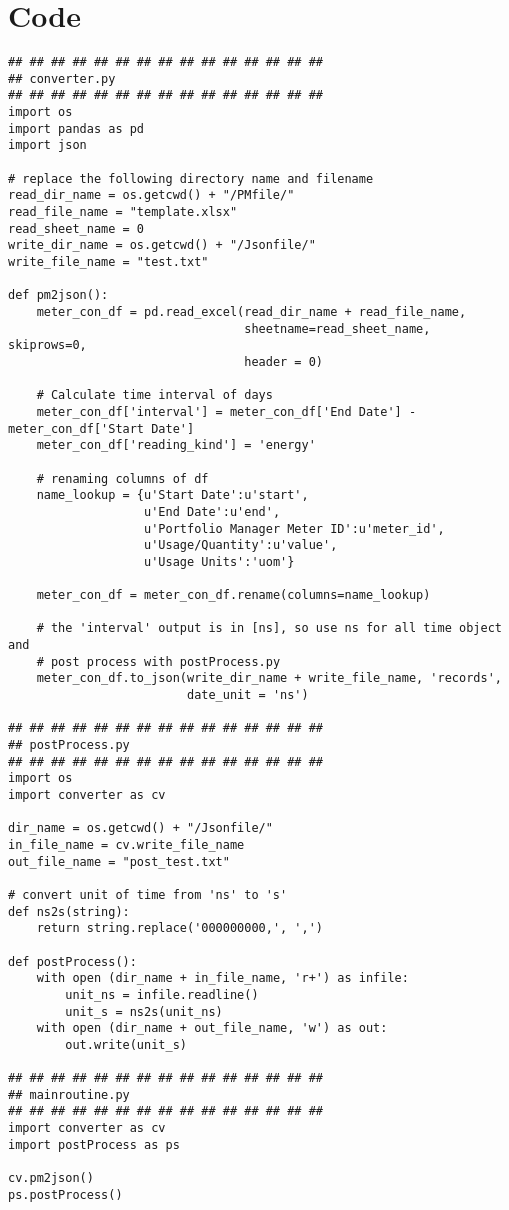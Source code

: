 \documentclass[12pt]{article}
\begin{document}
\section{Code}
\makeatletter
\def\verbatim@font{\linespread{1}\tiny\ttfamily}
\makeatother
\begin{verbatim}
## ## ## ## ## ## ## ## ## ## ## ## ## ## ## 
## converter.py
## ## ## ## ## ## ## ## ## ## ## ## ## ## ## 
import os 
import pandas as pd
import json

# replace the following directory name and filename
read_dir_name = os.getcwd() + "/PMfile/"
read_file_name = "template.xlsx"
read_sheet_name = 0
write_dir_name = os.getcwd() + "/Jsonfile/"
write_file_name = "test.txt"

def pm2json():
    meter_con_df = pd.read_excel(read_dir_name + read_file_name,
                                 sheetname=read_sheet_name, skiprows=0,
                                 header = 0)

    # Calculate time interval of days
    meter_con_df['interval'] = meter_con_df['End Date'] - meter_con_df['Start Date']
    meter_con_df['reading_kind'] = 'energy'

    # renaming columns of df
    name_lookup = {u'Start Date':u'start',
                   u'End Date':u'end',
                   u'Portfolio Manager Meter ID':u'meter_id',
                   u'Usage/Quantity':u'value',
                   u'Usage Units':'uom'}

    meter_con_df = meter_con_df.rename(columns=name_lookup)

    # the 'interval' output is in [ns], so use ns for all time object and
    # post process with postProcess.py
    meter_con_df.to_json(write_dir_name + write_file_name, 'records',
                         date_unit = 'ns')

## ## ## ## ## ## ## ## ## ## ## ## ## ## ## 
## postProcess.py
## ## ## ## ## ## ## ## ## ## ## ## ## ## ## 
import os 
import converter as cv

dir_name = os.getcwd() + "/Jsonfile/"
in_file_name = cv.write_file_name
out_file_name = "post_test.txt"

# convert unit of time from 'ns' to 's'
def ns2s(string):
    return string.replace('000000000,', ',')

def postProcess():
    with open (dir_name + in_file_name, 'r+') as infile:
        unit_ns = infile.readline()
        unit_s = ns2s(unit_ns)
    with open (dir_name + out_file_name, 'w') as out:
        out.write(unit_s)

## ## ## ## ## ## ## ## ## ## ## ## ## ## ## 
## mainroutine.py
## ## ## ## ## ## ## ## ## ## ## ## ## ## ## 
import converter as cv 
import postProcess as ps

cv.pm2json()
ps.postProcess()

\end{verbatim}
\end{document}
